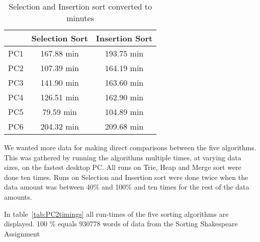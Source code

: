 \begin{table}[H]
\centering
\label{tab:timings2}
\begin{tabular}{c|cc}
 & Selection Sort & \multicolumn{1}{l}{Insertion Sort} \\ \hline
PC1 & 167.88 min & 193.75 min \\
PC2 & 107.39 min & 164.19 min \\
PC3 & 141.90 min & 163.60 min \\
PC4 & 126.51 min & 162.90 min \\
PC5 & 79.59 min & 104.89 min \\
\multicolumn{1}{l|}{PC6} & 204.32 min & 209.68 min
\end{tabular}
\caption{Selection and Insertion sort converted to minutes}
\end{table}

\vspace{0.5cm}
We wanted more data for making direct comparisons between the five algorithms. This was gathered by running the algorithms multiple times, at varying data sizes, on the fastest desktop PC. All runs on Trie, Heap and Merge sort were done ten times. Runs on Selection and Insertion sort were done twice when the data amount was between 40\% and 100\% and ten times for the rest of the data amounts. 

\begin{table}[H]
\caption{Run-times of algorithms on varying data amounts}
\label{tab:PC2timings}
\end{table}
In table~\ref{tab:PC2timings} all run-times of the five sorting algorithms are displayed. 100 \% equals 930778 words of data from the Sorting Shakespeare Assignment \cite{mal3}